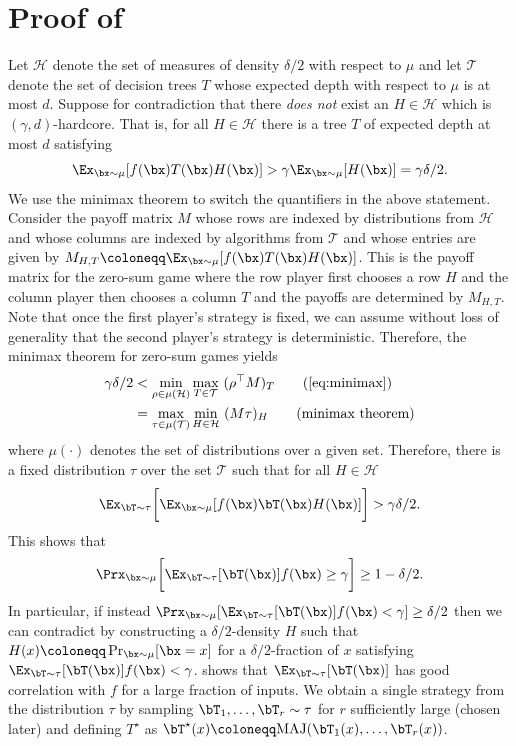 \documentclass[11pt]{article}
\begin{document}
\section{Proof of~}
\label{appendix:hardcore}
Let $\mathcal{H}$ denote the set of measures of density $\delta/2$ with respect to $\mu$ and let $\mathcal{T}$ denote the set of decision trees $T$ whose expected depth with respect to $\mu$ is at most $d$. Suppose for contradiction that there \textit{does not} exist an $H\in\mathcal{H}$ which is $(\gamma,d)$-hardcore. That is, for all $H\in\mathcal{H}$ there is a tree $T$ of expected depth at most $d$ satisfying
\begin{equation}
\label{eq:minimax}
\Ex_{\bx\sim\mu}[f(\bx)T(\bx)H(\bx)]>\gamma\Ex_{\bx\sim\mu}[H(\bx)]=\gamma\delta/2.
\end{equation}
We use the minimax theorem to switch the quantifiers in the above statement. Consider the payoff matrix $M$ whose rows are indexed by distributions from $\mathcal{H}$ and whose columns are indexed by algorithms from $\mathcal{T}$ and whose entries are given by $M_{H,T}\coloneqq \Ex_{\bx\sim\mu}[f(\bx)T(\bx)H(\bx)]$. This is the payoff matrix for the zero-sum game where the row player first chooses a row $H$ and the column player then chooses a column $T$ and the payoffs are determined by $M_{H,T}$. Note that once the first player's strategy is fixed, we can assume without loss of generality that the second player's strategy is deterministic. Therefore, the minimax theorem for zero-sum games yields
\begin{align*}
    \gamma\delta/2&<\min_{\rho\in\mu(\mathcal{H})}\max_{T\in\mathcal{T}}~ (\rho^{\top} M)_T\tag{\Cref{eq:minimax}}\\
    &=\max_{\tau\in\mu(\mathcal{T})}\min_{H\in\mathcal{H}}~(M\tau)_H\tag{minimax theorem}
\end{align*}
where $\mu(\cdot)$ denotes the set of distributions over a given set. Therefore, there is a fixed distribution $\tau$ over the set $\mathcal{T}$ such that for all $H\in\mathcal{H}$
\begin{equation}
\label{eq:hardcore}
\Ex_{\bT\sim\tau}\bigg[\Ex_{\bx\sim\mu}[f(\bx)\bT(\bx)H(\bx)]\bigg]>\gamma\delta/2.    
\end{equation}
This shows that
$$
\Prx_{\bx\sim\mu}\bigg[\Ex_{\bT\sim\tau}[\bT(\bx)]f(\bx)\ge \gamma\bigg]\ge 1-\delta/2.
$$
In particular, if instead $\Prx_{\bx\sim\mu}[\Ex_{\bT\sim\tau}[\bT(\bx)]f(\bx)<\gamma]\ge \delta/2$ then we can contradict  by constructing a $\delta/2$-density $H$ such that $H(x)\coloneqq\Pr_{\bx\sim\mu}[\bx=x]$ for a $\delta/2$-fraction of $x$ satisfying $\Ex_{\bT\sim\tau}[\bT(\bx)]f(\bx)< \gamma$.  shows that $\Ex_{\bT\sim\tau}[\bT(\bx)]$ has good correlation with $f$ for a large fraction of inputs. We obtain a single strategy from the distribution $\tau$ by sampling $\bT_1,\ldots,\bT_r\sim\tau$ for $r$ sufficiently large (chosen later) and defining $T^\star$ as $\bT^{\star}(x)\coloneqq \text{MAJ}(\bT_1(x),\ldots,\bT_r(x))$.
\end{document}
